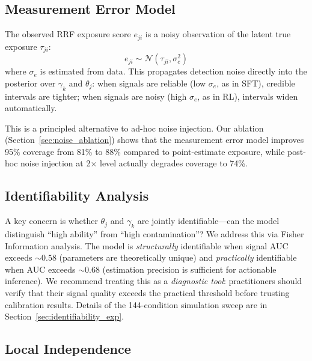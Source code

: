 \documentclass[letterpaper]{article}
\begin{document}
\subsection{Measurement Error Model}
\label{sec:measurement_error}

The observed RRF exposure score $e_{ji}$ is a noisy observation of the latent true exposure $\tau_{ji}$:
\begin{equation}
e_{ji} \sim \mathcal{N}(\tau_{ji}, \sigma_e^2)
\end{equation}
where $\sigma_e$ is estimated from data.
This propagates detection noise directly into the posterior over $\gamma_k$ and $\theta_j$: when signals are reliable (low $\sigma_e$, as in SFT), credible intervals are tighter; when signals are noisy (high $\sigma_e$, as in RL), intervals widen automatically.

This is a principled alternative to ad-hoc noise injection.
Our ablation (Section~\ref{sec:noise_ablation}) shows that the measurement error model improves 95\% coverage from 81\% to 88\% compared to point-estimate exposure, while post-hoc noise injection at 2$\times$ level actually degrades coverage to 74\%.

\subsection{Identifiability Analysis}
\label{sec:identifiability}

A key concern is whether $\theta_j$ and $\gamma_k$ are jointly identifiable---can the model distinguish ``high ability'' from ``high contamination''?
We address this via Fisher Information analysis.
The model is \emph{structurally} identifiable when signal AUC exceeds ${\sim}0.58$ (parameters are theoretically unique) and \emph{practically} identifiable when AUC exceeds ${\sim}0.68$ (estimation precision is sufficient for actionable inference).
We recommend treating this as a \emph{diagnostic tool}: practitioners should verify that their signal quality exceeds the practical threshold before trusting calibration results.
Details of the 144-condition simulation sweep are in Section~\ref{sec:identifiability_exp}.

\subsection{Local Independence}
\label{sec:local_indep}
\end{document}
